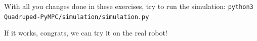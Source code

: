 \documentclass[11pt,a4paper]{article}
\begin{document}
With all you changes done in these exercises, try to run the simulation:
\verb|python3 Quadruped-PyMPC/simulation/simulation.py|

If it works, congrats, we can try it on the real robot!



% 
% 
% 
% 
% 

%
%
\end{document}
